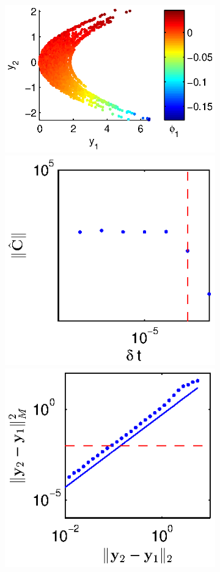 \begin{figure}[t]
\begin{subfigure}{\textwidth}
\includegraphics[height=\figheight]{data_nonlinear_NIV_dt2_kernel1}
\hfill
\includegraphics[height=\figheight]{C_dt_nonlinear_dt2_kernel1}
\hfill
\includegraphics[height=\figheight]{dist_dy_nonlinear_dt2_kernel1}
\end{subfigure}


\end{figure}
